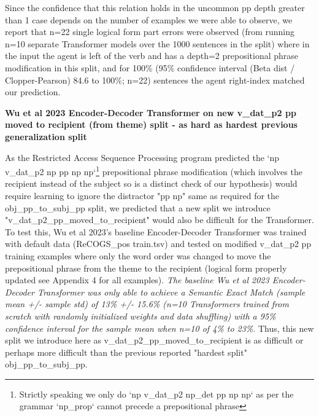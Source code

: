 \documentclass[11pt]{article}
\begin{document}
Since the confidence that this relation holds in the uncommon pp depth greater than 1 case depends on the number of examples we were able to observe, we report that n=22 single logical form part errors were observed (from running n=10 separate Transformer models over the 1000 sentences in the split) where in the input the agent is left of the verb and has a depth=2 prepositional phrase modification in this split, and for 100\% (95\% confidence interval (Beta dist / Clopper-Pearson) 84.6 to 100\%; n=22) sentences the agent right-index matched our prediction.

\textbf{Wu et al 2023 Encoder-Decoder Transformer on new v\_dat\_p2 pp moved to recipient (from theme) split - as hard as hardest previous generalization split}

As the Restricted Access Sequence Processing program predicted the `np v\_dat\_p2 np pp np np`\footnote{Strictly speaking we only do `np v\_dat\_p2 np\_det pp np np` as per the grammar `np\_prop` cannot precede a prepositional phrase} prepositional phrase modification (which involves the recipient instead of the subject so is a distinct check of our hypothesis) would require learning to ignore the distractor "pp np" same as required for the obj\_pp\_to\_subj\_pp split, we predicted that a new split we introduce "v\_dat\_p2\_pp\_moved\_to\_recipient" would also be difficult for the Transformer. To test this, Wu et al 2023's baseline Encoder-Decoder Transformer was trained with default data (ReCOGS\_pos train.tsv) and tested on modified v\_dat\_p2 pp training examples where only the word order was changed to move the prepositional phrase from the theme to the recipient (logical form properly updated see Appendix 4 for all examples). \textit{The baseline Wu et al 2023 Encoder-Decoder Transformer was only able to achieve a Semantic Exact Match (sample mean +/- sample std) of 13\% +/- 15.6\% (n=10 Transformers trained from scratch with randomly initialized weights and data shuffling) with a 95\% confidence interval for the sample mean when n=10 of 4\% to 23\%}. Thus, this new split we introduce here as v\_dat\_p2\_pp\_moved\_to\_recipient is as difficult or perhaps more difficult than the previous reported "hardest split" obj\_pp\_to\_subj\_pp.

\end{document}
